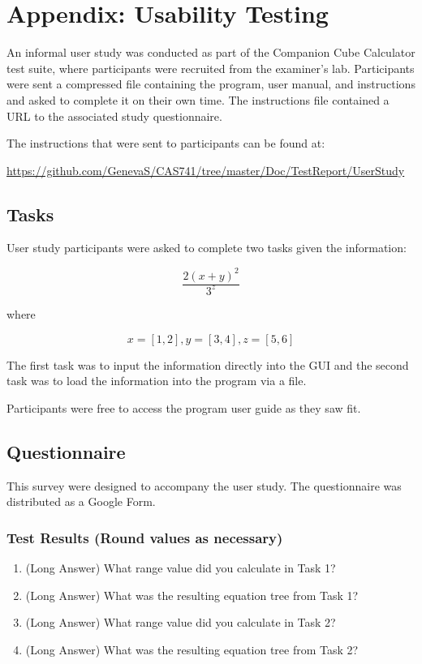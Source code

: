 \documentclass[12pt, titlepage]{article}
\newcommand{\progname}{Companion Cube Calculator} %
\begin{document}
%

%

\newpage

\section{Appendix: Usability Testing}
\label{appendix_userstudy}
An informal user study was conducted as part of the \progname{} test suite, 
where participants were recruited from the examiner's lab. Participants were 
sent a compressed file containing the program, user manual, and instructions 
and asked to complete it on their own time. The instructions file contained a 
URL to the associated study questionnaire. 

The instructions that were sent to participants can be found at: 

\begin{center}
	\href{https://github.com/GenevaS/CAS741/tree/master/Doc/TestReport/UserStudy}{https://github.com/GenevaS/CAS741/tree/master/Doc/TestReport/UserStudy}
\end{center}

\subsection{Tasks}
User study participants were asked to complete two tasks given the information: 

$$\frac{2(x + y)^2}{3^z}$$

where

$$x = [1, 2], y = [3, 4], z = [5, 6]$$

The first task was to input the information directly into the GUI and the 
second task was to load the information into the program via a file.

Participants were free to access the program user guide as they saw fit. 

\subsection{Questionnaire}
This survey were designed to accompany the user study. The questionnaire was 
distributed as a Google Form.

\subsubsection{Test Results (Round values as necessary)}
\begin{enumerate}
	\item (Long Answer) What range value did you calculate in Task 1?
	\item (Long Answer) What was the resulting equation tree from Task 1?
	\item (Long Answer) What range value did you calculate in Task 2?
	\item (Long Answer) What was the resulting equation tree from Task 2?
\end{enumerate}
\end{document}
